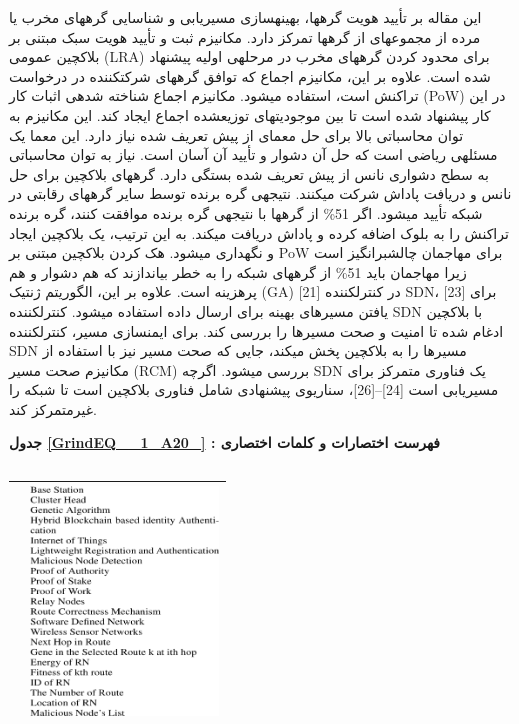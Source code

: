 \documentclass{article} %
\begin{document}
\noindent این مقاله بر تأیید هویت گرهها، بهینهسازی مسیریابی و شناسایی گرههای مخرب یا مرده از مجموعهای از گرهها تمرکز دارد. مکانیزم ثبت و تأیید هویت سبک مبتنی بر بلاکچین عمومی (LRA) برای محدود کردن گرههای مخرب در مرحلهی اولیه پیشنهاد شده است. علاوه بر این، مکانیزم اجماع که توافق گرههای شرکتکننده در درخواست تراکنش است، استفاده میشود. مکانیزم اجماع شناخته شدهی اثبات کار (PoW) در این کار پیشنهاد شده است تا بین موجودیتهای توزیعشده اجماع ایجاد کند. این مکانیزم به توان محاسباتی بالا برای حل معمای از پیش تعریف شده نیاز دارد. این معما یک مسئلهی ریاضی است که حل آن دشوار و تأیید آن آسان است. نیاز به توان محاسباتی به سطح دشواری نانس از پیش تعریف شده بستگی دارد. گرههای بلاکچین برای حل نانس و دریافت پاداش شرکت میکنند. نتیجهی گره برنده توسط سایر گرههای رقابتی در شبکه تأیید میشود. اگر 51\% از گرهها با نتیجهی گره برنده موافقت کنند، گره برنده تراکنش را به بلوک اضافه کرده و پاداش دریافت میکند. به این ترتیب، یک بلاکچین ایجاد و نگهداری میشود. هک کردن بلاکچین مبتنی بر PoW برای مهاجمان چالشبرانگیز است زیرا مهاجمان باید 51\% از گرههای شبکه را به خطر بیاندازند که هم دشوار و هم پرهزینه است. علاوه بر این، الگوریتم ژنتیک (GA) [21] در کنترلکننده SDN، [23] برای یافتن مسیرهای بهینه برای ارسال داده استفاده میشود. کنترلکننده SDN با بلاکچین ادغام شده تا امنیت و صحت مسیرها را بررسی کند. برای ایمنسازی مسیر، کنترلکننده SDN مسیرها را به بلاکچین پخش میکند، جایی که صحت مسیر نیز با استفاده از مکانیزم صحت مسیر (RCM) بررسی میشود. اگرچه SDN یک فناوری متمرکز برای مسیریابی است [24]--[26]، سناریوی پیشنهادی شامل فناوری بلاکچین است تا شبکه را غیرمتمرکز کند.

\noindent \textbf{ جدول \eqref{GrindEQ__1_A20_} : فهرست اختصارات و کلمات اختصاری}

\begin{tabular}{|p{0.7in}|p{1.4in}|} \hline 
 &  \\ \hline 
\end{tabular}



\begin{tabular}{|p{0.7in}|p{1.4in}|} \hline 
 & \includegraphics*[width=1.97in, height=2.40in]{image2} \\ \hline 
\end{tabular}
\end{document}
